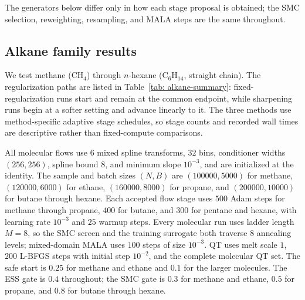 \documentclass{article}
\begin{document}
The generators below differ only in how each stage proposal is obtained; the SMC selection, reweighting, resampling, and MALA steps are the same throughout.

\subsection{Alkane family results}
\label{sec: alkane-results}

We test methane (\(\mathrm{CH_4}\)) through \(n\)-hexane (\(\mathrm{C_6H_{14}}\), straight chain). The regularization paths are listed in Table~\ref{tab: alkane-summary}: fixed-regularization runs start and remain at the common endpoint, while sharpening runs begin at a softer setting and advance linearly to it. The three methods use method-specific adaptive stage schedules, so stage counts and recorded wall times are descriptive rather than fixed-compute comparisons.

All molecular flows use $6$ mixed spline transforms, $32$ bins, conditioner widths $(256,256)$, spline bound $8$, and minimum slope $10^{-3}$, and are initialized at the identity. The sample and batch sizes $(N,B)$ are $(100000,5000)$ for methane, $(120000,6000)$ for ethane, $(160000,8000)$ for propane, and $(200000,10000)$ for butane through hexane. Each accepted flow stage uses $500$ Adam steps for methane through propane, $400$ for butane, and $300$ for pentane and hexane, with learning rate $10^{-3}$ and $25$ warmup steps. Every molecular run uses ladder length $M=8$, so the SMC screen and the training surrogate both traverse $8$ annealing levels; mixed-domain MALA uses $100$ steps of size $10^{-3}$. QT uses melt scale $1$, $200$ L-BFGS steps with initial step $10^{-2}$, and the complete molecular QT set. The safe start is $0.25$ for methane and ethane and $0.1$ for the larger molecules. The ESS gate is $0.4$ throughout; the SMC gate is $0.3$ for methane and ethane, $0.5$ for propane, and $0.8$ for butane through hexane.
\end{document}

